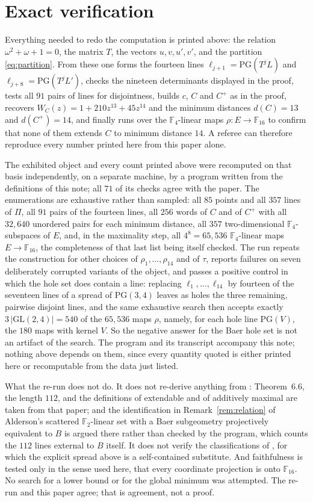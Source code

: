 \documentclass[11pt]{amsart}
\theoremstyle{remark}
\newcommand{\F}{\mathbb F}
\newcommand{\PG}{\mathrm{PG}}
\begin{document}
\section*{Exact verification}

Everything needed to redo the computation is printed above: the relation
$\omega^2+\omega+1=0$, the matrix $T$, the vectors $u,v,u',v'$, and the
partition \eqref{eq:partition}. From these one forms the fourteen lines
$\ell_{j+1}=\PG(T^jL)$ and $\ell_{j+8}=\PG(T^jL')$, checks the nineteen
determinants displayed in the proof, tests all $91$ pairs of lines for
disjointness, builds $c$, $C$ and $C^+$ as in the proof, recovers
$W_C(z)=1+210z^{13}+45z^{14}$ and the minimum distances $d(C)=13$ and
$d(C^+)=14$, and finally runs over the $\F_4$-linear maps
$\rho:E\to\F_{16}$ to confirm that none of them extends $C$ to minimum
distance $14$. A referee can therefore reproduce every number printed here
from this paper alone.

The exhibited object and every count printed above were recomputed on that
basis independently, on a separate machine, by a program written from the
definitions of this note; all $71$ of its checks agree with the paper. The
enumerations are exhaustive rather than sampled: all $85$ points and all
$357$ lines of $\Pi$, all $91$ pairs of the fourteen lines, all $256$ words of $C$ and of $C^+$ with all $32{,}640$
unordered pairs for each minimum distance, all $357$ two-dimensional
$\F_4$-subspaces of $E$, and, in the maximality step, all $4^8=65{,}536$
$\F_4$-linear maps $E\to\F_{16}$, the completeness of that last list being
itself checked. The run repeats the construction for other choices of
$\rho_1,\ldots,\rho_{14}$ and of $\tau$, reports failures on seven
deliberately corrupted variants of the object, and passes a positive control
in which the hole set does contain a line: replacing $\ell_1,\ldots,\ell_{14}$
by fourteen of the seventeen lines of a spread of $\PG(3,4)$ leaves as holes
the three remaining, pairwise disjoint lines, and the same exhaustive search
then accepts exactly $3\,|\mathrm{GL}(2,4)|=540$ of the $65{,}536$ maps
$\rho$, namely, for each hole line $\PG(V)$, the $180$ maps with kernel $V$.
So the negative answer for the Baer hole set is not an artifact of the
search. The program and its transcript accompany this note; nothing above
depends on them, since every quantity quoted is either
printed here or recomputable from the data just listed.

What the re-run does not do. It does not re-derive anything from
\cite{Alderson}: Theorem~6.6, the length $112$, and the definitions of
extendable and of additively maximal are taken from that paper; and the
identification in Remark~\ref{rem:relation} of Alderson's scattered
$\F_2$-linear set with a Baer subgeometry projectively equivalent to $B$ is
argued there rather than checked by the program, which counts the $112$ lines
external to $B$ itself. It does not
verify the classifications of \cite{vanDam,Mellinger}, for which the
explicit spread above is a self-contained substitute. And faithfulness is
tested only in the sense used here, that every coordinate projection is onto
$\F_{16}$. No search for a lower bound or for the global minimum was
attempted. The re-run and this paper agree; that is agreement, not a proof.
\end{document}
